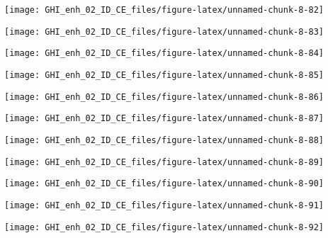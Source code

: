 \documentclass[
  10pt,
  a4paper,oneside]{article}
\begin{document}
\begin{center}\texttt{[image: GHI\_enh\_02\_ID\_CE\_files/figure-latex/unnamed-chunk-8-82]} \end{center}

\begin{center}\texttt{[image: GHI\_enh\_02\_ID\_CE\_files/figure-latex/unnamed-chunk-8-83]} \end{center}

\begin{center}\texttt{[image: GHI\_enh\_02\_ID\_CE\_files/figure-latex/unnamed-chunk-8-84]} \end{center}

\begin{center}\texttt{[image: GHI\_enh\_02\_ID\_CE\_files/figure-latex/unnamed-chunk-8-85]} \end{center}

\begin{center}\texttt{[image: GHI\_enh\_02\_ID\_CE\_files/figure-latex/unnamed-chunk-8-86]} \end{center}

\begin{center}\texttt{[image: GHI\_enh\_02\_ID\_CE\_files/figure-latex/unnamed-chunk-8-87]} \end{center}

\begin{center}\texttt{[image: GHI\_enh\_02\_ID\_CE\_files/figure-latex/unnamed-chunk-8-88]} \end{center}

\begin{center}\texttt{[image: GHI\_enh\_02\_ID\_CE\_files/figure-latex/unnamed-chunk-8-89]} \end{center}

\begin{center}\texttt{[image: GHI\_enh\_02\_ID\_CE\_files/figure-latex/unnamed-chunk-8-90]} \end{center}

\begin{center}\texttt{[image: GHI\_enh\_02\_ID\_CE\_files/figure-latex/unnamed-chunk-8-91]} \end{center}

\begin{center}\texttt{[image: GHI\_enh\_02\_ID\_CE\_files/figure-latex/unnamed-chunk-8-92]} \end{center}
\end{document}
